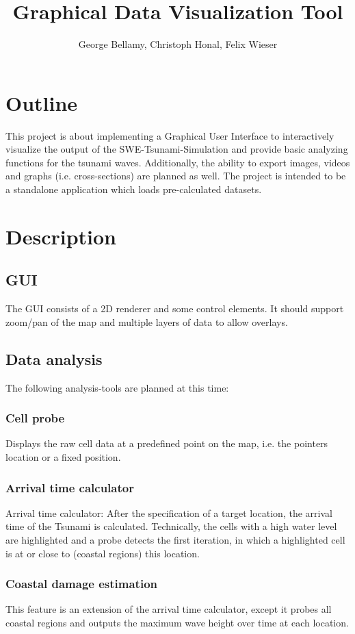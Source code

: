 \documentclass[paper=a4]{proc}
\title{Graphical Data Visualization Tool}
\author{George Bellamy, Christoph Honal, Felix Wieser}
\begin{document}
	\maketitle
	\thispagestyle{plain}	%
	\section{Outline}
		This project is about implementing a Graphical User Interface to interactively visualize the output of the SWE-Tsunami-Simulation and provide basic analyzing functions for the tsunami waves. Additionally, the ability to export images, videos and graphs (i.e. cross-sections) are planned as well. The project is intended to be a standalone application which loads pre-calculated datasets.
	\section{Description}
		\subsection{GUI}
			The GUI consists of a 2D renderer and some control elements. It should support zoom/pan of the map and multiple layers of data to allow overlays.
 		\subsection{Data analysis}
			The following analysis-tools are planned at this time:
			\subsubsection*{Cell probe}
				Displays the raw cell data at a predefined point on the map, i.e. the pointers location or a fixed position.
			\subsubsection*{Arrival time calculator}
				Arrival time calculator: After the specification of a target location, the arrival time of the Tsunami is calculated. Technically, the cells with a high water level are highlighted and a probe detects the first iteration, in which a highlighted cell is at or close to (coastal regions) this location.
			\subsubsection*{Coastal damage estimation}
				This feature is an extension of the arrival time calculator, except it probes all coastal regions and outputs the maximum wave height over time at each location.
\end{document}
